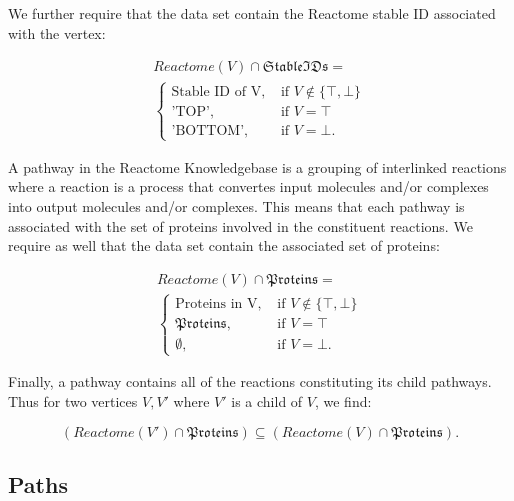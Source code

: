 \documentclass{article}
\begin{document}
We further require that the data set contain the Reactome stable ID associated with the vertex:

\begin{equation}
	\begin{aligned}
		Reactome(V) \cap \mathfrak{StableIDs} = \\
		\begin{cases}
			\text{Stable ID of V}, & \text{ if $V \notin \{\top, \bot\}$} \\
			\text{'TOP'}, & \text{ if $V = \top$} \\
			\text{'BOTTOM'}, & \text{ if $V = \bot$}.
		\end{cases}
	\end{aligned}
\end{equation}

A pathway in the Reactome Knowledgebase is a grouping of interlinked reactions where a reaction is a process that convertes input molecules and/or complexes into output molecules and/or complexes.\cite{https://reactome.org/documentation/data-model} This means that each pathway is associated with the set of proteins involved in the constituent reactions. We require as well that the data set contain the associated set of proteins:

\begin{equation}
	\begin{aligned}
		Reactome(V) \cap \mathfrak{Proteins} = \\
		\begin{cases}
			\text{Proteins in V}, & \text{ if $V \notin \{\top, \bot\}$} \\
			\mathfrak{Proteins}, & \text{ if $V = \top$} \\
			\emptyset , & \text{ if $V = \bot$}.
		\end{cases}
	\end{aligned}
\end{equation}

Finally, a pathway contains all of the reactions constituting its child pathways. Thus for two vertices $V, V'$ where $V'$ is a child of $V$, we find:

\begin{equation}
(Reactome(V') \cap \mathfrak{Proteins}) \subseteq (Reactome(V) \cap \mathfrak{Proteins}).
\end{equation}

\subsection{Paths}
\end{document}
